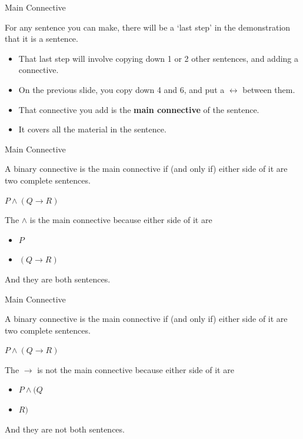 \documentclass[
  ignorenonframetext,
]{beamer}
\providecommand{\tightlist}{%
  \setlength{\itemsep}{0pt}\setlength{\parskip}{0pt}}
\renewcommand{\,}{\text{, }}
\renewenvironment*{quote}	
	{\list{}{\rightmargin   \leftmargin} \item } 	
	{\endlist }
\begin{document}
\begin{frame}{Main Connective}
\protect\hypertarget{main-connective}{}

For any sentence you can make, there will be a `last step' in the
demonstration that it is a sentence.

\begin{itemize}
\tightlist
\item
  That last step will involve copying down 1 or 2 other sentences, and
  adding a connective.
\item
  On the previous slide, you copy down 4 and 6, and put a
  \(\leftrightarrow\) between them.
\item
  That connective you add is the \textbf{main connective} of the
  sentence.
\item
  It covers all the material in the sentence.
\end{itemize}

\end{frame}

\begin{frame}{Main Connective}
\protect\hypertarget{main-connective-1}{}

A binary connective is the main connective if (and only if) either side
of it are two complete sentences.

\begin{quote}
\(P \wedge (Q \rightarrow R)\)
\end{quote}

The \(\wedge\) is the main connective because either side of it are

\begin{itemize}
\tightlist
\item
  \(P\)
\item
  \((Q \rightarrow R)\)
\end{itemize}

And they are both sentences.

\end{frame}

\begin{frame}{Main Connective}
\protect\hypertarget{main-connective-2}{}

A binary connective is the main connective if (and only if) either side
of it are two complete sentences.

\begin{quote}
\(P \wedge (Q \rightarrow R)\)
\end{quote}

The \(\rightarrow\) is not the main connective because either side of it
are

\begin{itemize}
\tightlist
\item
  \(P \wedge (Q\)
\item
  \(R)\)
\end{itemize}

And they are not both sentences.

\end{frame}
\end{document}
